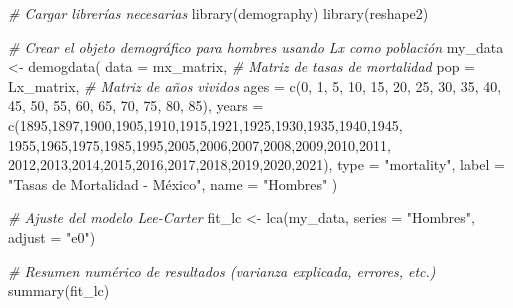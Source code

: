 \documentclass[
]{article}
\newenvironment{Shaded}{\begin{snugshade}}{\end{snugshade}}
\newcommand{\AttributeTok}[1]{\textcolor[rgb]{0.77,0.63,0.00}{#1}}
\newcommand{\CommentTok}[1]{\textcolor[rgb]{0.56,0.35,0.01}{\textit{#1}}}
\newcommand{\DecValTok}[1]{\textcolor[rgb]{0.00,0.00,0.81}{#1}}
\newcommand{\FunctionTok}[1]{\textcolor[rgb]{0.00,0.00,0.00}{#1}}
\newcommand{\NormalTok}[1]{#1}
\newcommand{\OtherTok}[1]{\textcolor[rgb]{0.56,0.35,0.01}{#1}}
\newcommand{\StringTok}[1]{\textcolor[rgb]{0.31,0.60,0.02}{#1}}
\begin{document}
\begin{Shaded}
\begin{Highlighting}[]
\CommentTok{\# Cargar librerías necesarias}
\FunctionTok{library}\NormalTok{(demography)}
\FunctionTok{library}\NormalTok{(reshape2)}

\CommentTok{\# Crear el objeto demográfico para hombres usando Lx como población}
\NormalTok{my\_data }\OtherTok{\textless{}{-}} \FunctionTok{demogdata}\NormalTok{(}
  \AttributeTok{data =}\NormalTok{ mx\_matrix,     }\CommentTok{\# Matriz de tasas de mortalidad}
  \AttributeTok{pop =}\NormalTok{ Lx\_matrix,      }\CommentTok{\# Matriz de años vividos}
  \AttributeTok{ages =} \FunctionTok{c}\NormalTok{(}\DecValTok{0}\NormalTok{, }\DecValTok{1}\NormalTok{, }\DecValTok{5}\NormalTok{, }\DecValTok{10}\NormalTok{, }\DecValTok{15}\NormalTok{, }\DecValTok{20}\NormalTok{, }\DecValTok{25}\NormalTok{, }\DecValTok{30}\NormalTok{, }\DecValTok{35}\NormalTok{, }\DecValTok{40}\NormalTok{, }\DecValTok{45}\NormalTok{, }\DecValTok{50}\NormalTok{, }\DecValTok{55}\NormalTok{, }\DecValTok{60}\NormalTok{, }\DecValTok{65}\NormalTok{, }\DecValTok{70}\NormalTok{, }\DecValTok{75}\NormalTok{, }\DecValTok{80}\NormalTok{, }\DecValTok{85}\NormalTok{),}
  \AttributeTok{years =} \FunctionTok{c}\NormalTok{(}\DecValTok{1895}\NormalTok{,}\DecValTok{1897}\NormalTok{,}\DecValTok{1900}\NormalTok{,}\DecValTok{1905}\NormalTok{,}\DecValTok{1910}\NormalTok{,}\DecValTok{1915}\NormalTok{,}\DecValTok{1921}\NormalTok{,}\DecValTok{1925}\NormalTok{,}\DecValTok{1930}\NormalTok{,}\DecValTok{1935}\NormalTok{,}\DecValTok{1940}\NormalTok{,}\DecValTok{1945}\NormalTok{,}
            \DecValTok{1955}\NormalTok{,}\DecValTok{1965}\NormalTok{,}\DecValTok{1975}\NormalTok{,}\DecValTok{1985}\NormalTok{,}\DecValTok{1995}\NormalTok{,}\DecValTok{2005}\NormalTok{,}\DecValTok{2006}\NormalTok{,}\DecValTok{2007}\NormalTok{,}\DecValTok{2008}\NormalTok{,}\DecValTok{2009}\NormalTok{,}\DecValTok{2010}\NormalTok{,}\DecValTok{2011}\NormalTok{,}
            \DecValTok{2012}\NormalTok{,}\DecValTok{2013}\NormalTok{,}\DecValTok{2014}\NormalTok{,}\DecValTok{2015}\NormalTok{,}\DecValTok{2016}\NormalTok{,}\DecValTok{2017}\NormalTok{,}\DecValTok{2018}\NormalTok{,}\DecValTok{2019}\NormalTok{,}\DecValTok{2020}\NormalTok{,}\DecValTok{2021}\NormalTok{),}
  \AttributeTok{type =} \StringTok{"mortality"}\NormalTok{,}
  \AttributeTok{label =} \StringTok{"Tasas de Mortalidad {-} México"}\NormalTok{,}
  \AttributeTok{name =} \StringTok{"Hombres"}
\NormalTok{)}

\CommentTok{\# Ajuste del modelo Lee{-}Carter}
\NormalTok{fit\_lc }\OtherTok{\textless{}{-}} \FunctionTok{lca}\NormalTok{(my\_data, }\AttributeTok{series =} \StringTok{"Hombres"}\NormalTok{, }\AttributeTok{adjust =} \StringTok{"e0"}\NormalTok{)}

\CommentTok{\# Resumen numérico de resultados (varianza explicada, errores, etc.)}
\FunctionTok{summary}\NormalTok{(fit\_lc)}
\end{Highlighting}
\end{Shaded}
\end{document}
